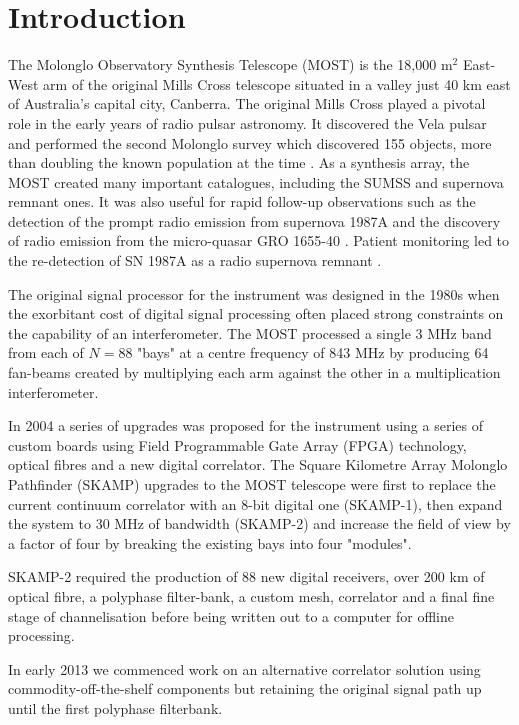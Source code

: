 \section{Introduction} 
The Molonglo Observatory Synthesis Telescope (MOST) is the 18,000 m$^2$ East-West arm of the original Mills Cross telescope situated in a valley just 40 km east of Australia's capital city, Canberra. The original Mills Cross played a pivotal role in the early years of radio pulsar astronomy. It discovered the Vela pulsar  and performed the second Molonglo survey which discovered 155 objects, more than doubling the known population at the time \cite{Manchester_1978}. As a synthesis array, the MOST created many important catalogues, including the SUMSS \cite{Bock_1999,Mauch_2003} and supernova remnant \cite{Whiteoak_1996} ones. It was also useful for rapid follow-up observations such as the detection of the prompt radio emission from supernova 1987A \cite{Turtle_1987} and the discovery of radio emission from the micro-quasar GRO 1655-40 \cite{Tingay_1995}. Patient monitoring led to the re-detection of SN 1987A as a radio supernova remnant \cite{Staveley_Smith_1992}.

The original signal processor for the instrument \cite{Robertson_1991} was designed in the 1980s when the exorbitant cost of digital signal processing often placed strong constraints on the capability of an interferometer. The MOST processed a single 3 MHz band from each of $N=88$ "bays" at a centre frequency of 843 MHz by producing 64 fan-beams created by multiplying each arm against the other in a multiplication interferometer. 

In 2004 a series of upgrades was proposed for the instrument using a series of custom boards using Field Programmable Gate Array (FPGA) technology, optical fibres and a new digital correlator\cite{Adams_2004}. The Square Kilometre Array Molonglo Pathfinder (SKAMP) upgrades to the MOST telescope were first to replace the current continuum correlator with an 8-bit digital one (SKAMP-1), then expand the system to 30 MHz of bandwidth (SKAMP-2) and increase the field of view by a factor of four by breaking the existing bays into four "modules".

SKAMP-2 required the production of 88 new digital receivers, over 200 km of optical fibre, a polyphase filter-bank, a custom mesh, correlator and a final fine stage of channelisation before being written out to a computer for offline processing.

In early 2013 we commenced work on an alternative correlator solution using commodity-off-the-shelf components but retaining the original signal path up until the first polyphase filterbank. 

